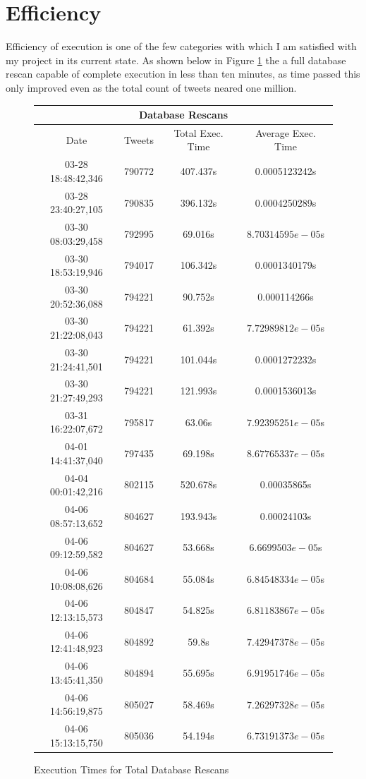 \documentclass[12pt,a4paper]{report}
\begin{document}
  \section{Efficiency}
  Efficiency of execution is one of the few categories with which I am satisfied with my project in its current state. As shown below in Figure \ref{t:2} the a full database rescan capable of complete execution in less than ten minutes, as time passed this only improved even as the total count of tweets neared one million.
  \begin{figure}[h]
    \centering
    \begin{tabular}{|c|c|c|c|}
      \hline
      \multicolumn{4}{|c|}{Database Rescans} \\
      \hline
      Date & Tweets & Total Exec. Time & Average Exec. Time \\ [0.5ex]
      \hline
      03-28 18:48:42,346 & 790772 & 407.437s & 0.0005123242s \\
      \hline
      03-28 23:40:27,105 & 790835 & 396.132s & 0.0004250289s \\
      \hline 
      03-30 08:03:29,458 & 792995 & 69.016s & $8.70314595e-05$s \\
      \hline
      03-30 18:53:19,946 & 794017 & 106.342s & 0.0001340179s \\
      \hline
      03-30 20:52:36,088 & 794221 & 90.752s & 0.000114266s \\
      \hline
      03-30 21:22:08,043 & 794221 & 61.392s & $7.72989812e-05$s \\
      \hline
      03-30 21:24:41,501 & 794221 & 101.044s & 0.0001272232s \\
      \hline
      03-30 21:27:49,293 & 794221 & 121.993s & 0.0001536013s \\
      \hline
      03-31 16:22:07,672 & 795817 & 63.06s & $7.92395251e-05$s \\
      \hline 
      04-01 14:41:37,040 & 797435 & 69.198s & $8.67765337e-05$s \\
      \hline
      04-04 00:01:42,216 & 802115 & 520.678s & 0.00035865s \\
      \hline
      04-06 08:57:13,652 & 804627 & 193.943s & 0.00024103s \\
      \hline
      04-06 09:12:59,582 & 804627 & 53.668s & $6.6699503e-05$s \\
      \hline
      04-06 10:08:08,626 & 804684 & 55.084s & $6.84548334e-05$s \\
      \hline
      04-06 12:13:15,573 & 804847 & 54.825s & $6.81183867e-05$s \\
      \hline
      04-06 12:41:48,923 & 804892 & 59.8s & $7.42947378e-05$s \\
      \hline
      04-06 13:45:41,350 & 804894 & 55.695s & $6.91951746e-05$s \\
      \hline
      04-06 14:56:19,875 & 805027 & 58.469s & $7.26297328e-05$s \\
      \hline
      04-06 15:13:15,750 & 805036 & 54.194s & $6.73191373e-05$s \\
      \hline
    \end{tabular}
    \caption{Execution Times for Total Database Rescans}
    \label{t:2}
  \end{figure}
\end{document}
